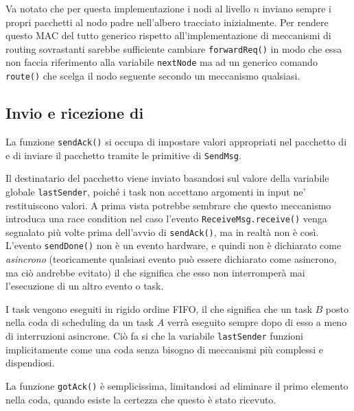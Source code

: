 \documentclass[twoside,11pt,a4paper,italian,openany]{book}
\begin{document}
Va notato che per questa implementazione i nodi al livello $n$ inviano sempre i propri 
pacchetti al nodo padre nell'albero tracciato inizialmente. 
Per rendere questo MAC del tutto generico rispetto all'implementazione di meccanismi di 
routing sovrastanti sarebbe sufficiente cambiare \texttt{forwardReq()} in modo che essa 
non faccia riferimento alla variabile  \texttt{nextNode} ma ad un generico comando 
\texttt{route()} che scelga il nodo seguente secondo un meccanismo qualsiasi.  

\subsection{Invio e ricezione di \ack}
La funzione \texttt{sendAck()} si occupa di impostare valori appropriati nel pacchetto di \ack 
e di inviare il pacchetto tramite le primitive di \texttt{SendMsg}. 

Il destinatario del pacchetto \ack viene inviato basandosi sul valore della variabile 
globale \texttt{lastSender}, poiché i task non accettano argomenti in input ne' 
restituiscono valori. 
A prima vista potrebbe sembrare che questo meccanismo introduca una race condition nel 
caso l'evento \texttt{ReceiveMsg.receive()} venga segnalato più volte prima dell'avvio 
di \texttt{sendAck()},
ma in realtà non è così. L'evento \texttt{sendDone()} non è un evento hardware, e quindi non 
è dichiarato come \emph{asincrono} (teoricamente qualsiasi evento può essere dichiarato come 
asincrono, ma ciò andrebbe evitato)
 il che significa che esso non interromperà mai l'esecuzione di un altro evento o task. 

I task vengono eseguiti in rigido ordine FIFO, il che significa che un task $B$ posto nella coda
di scheduling da un task $A$ verrà eseguito sempre dopo di esso a meno di interruzioni asincrone.
Ciò fa si che la variabile \texttt{lastSender} funzioni implicitamente come una coda senza 
bisogno di meccanismi più complessi e dispendiosi. 

La funzione \texttt{gotAck()} è semplicissima, limitandosi ad eliminare il primo elemento 
nella coda, quando esiste la certezza che questo è stato ricevuto. 
\end{document}
